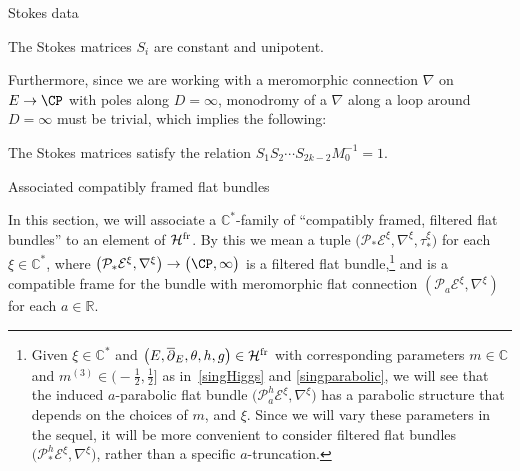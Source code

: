 \begin{subsubsection}{Stokes data}
\begin{Proposition} The Stokes matrices $S_i$ are constant and unipotent.
\end{Proposition}


Furthermore, since we are working with a meromorphic connection $\nabla$ on $E\to \CP$ with poles along $D=\infty$, monodromy of a $\nabla$ along a loop around $D=\infty$ must be trivial, which implies the following:

\begin{Proposition}\label{MonodromyStokes} The Stokes matrices satisfy the relation $S_1S_2\cdots S_{2k-2}M_0^{-1}=1$.
\end{Proposition}
\end{subsubsection}

\begin{subsubsection}{Associated compatibly framed flat bundles}

In this section, we will associate a $\mathbb{C}^*$-family of ``compatibly framed, filtered flat bundles'' to an element of $\mathcal{H}^{{\rm fr}}$. By this we mean a tuple $\bigl(\mathcal{P}_*\mathcal{E}^{\xi},\nabla^{\xi}, \tau_*^{\xi}\bigr)$ for each $\xi\in \mathbb{C}^*$, where $\bigl(\mathcal{P}_*\mathcal{E}^{\xi},\nabla^{\xi}\bigr) \to \bigl(\CP,\infty\bigr)$ is a filtered flat bundle,\footnote{Given $\xi \in \mathbb{C}^*$ and $\bigl(E,\overline{\partial}_E,\theta,h,g\bigr)\in \mathcal{H}^{{\rm fr}}$ with corresponding parameters $m\in \mathbb{C}$ and $m^{(3)}\in \bigl(-\frac12,\frac12\bigr]$ as in~\eqref{singHiggs} and \eqref{singparabolic}, we will see that the induced $a$-parabolic flat bundle $\bigl(\mathcal{P}^h_a\mathcal{E}^{\xi},\nabla^{\xi}\bigr)$ has a parabolic structure that depends on the choices of $m$,  and $\xi$. Since we will vary these parameters in the sequel, it will be more convenient to consider filtered flat bundles $\bigl(\mathcal{P}_*^h\mathcal{E}^{\xi},\nabla^{\xi}\bigr)$, rather than a specific $a$-truncation.} and  is a compatible frame for the bundle with meromorphic flat connection $(\mathcal{P}_a\mathcal{E}^{\xi},\nabla^{\xi})$ for each $a\in \mathbb{R}$.


\end{subsubsection}
